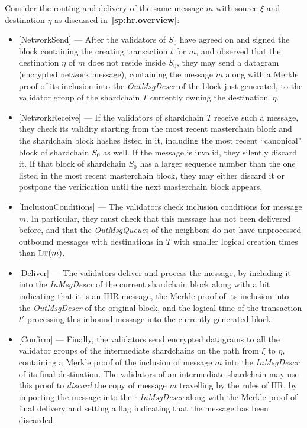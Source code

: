\documentclass[12pt,oneside]{article}
\def\refpoint#1{{\rm\textbf{\ref{#1}}}}
\let\ptref=\refpoint
\def\opsc#1{\operatorname{\textsc{#1}}}
\def\LT{\opsc{Lt}}
\begin{document}
Consider the routing and delivery of the same message $m$ with source $\xi$ and destination $\eta$ as discussed in~\ptref{sp:hr.overview}:
\begin{itemize}
\item{[NetworkSend]} --- After the validators of $S_0$ have agreed on and signed the block containing the creating transaction $t$ for $m$, and observed that the destination $\eta$ of $m$ does not reside inside $S_0$, they may send a datagram (encrypted network message), containing the message $m$ along with a Merkle proof of its inclusion into the {\em OutMsgDescr\/} of the block just generated, to the validator group of the shardchain $T$ currently owning the destination~$\eta$.
\item{[NetworkReceive]} --- If the validators of shardchain $T$ receive such a message, they check its validity starting from the most recent masterchain block and the shardchain block hashes listed in it, including the most recent ``canonical'' block of shardchain $S_0$ as well. If the message is invalid, they silently discard it. If that block of shardchain $S_0$ has a larger sequence number than the one listed in the most recent masterchain block, they may either discard it or postpone the verification until the next masterchain block appears.
\item{[InclusionConditions]} --- The validators check inclusion conditions for message $m$. In particular, they must check that this message has not been delivered before, and that the {\em OutMsgQueue\/}s of the neighbors do not have unprocessed outbound messages with destinations in $T$ with smaller logical creation times than $\LT(m)$.
\item{[Deliver]} --- The validators deliver and process the message, by including it into the {\em InMsgDescr\/} of the current shardchain block along with a bit indicating that it is an IHR message, the Merkle proof of its inclusion into the {\em OutMsgDescr\/} of the original block, and the logical time of the transaction $t'$ processing this inbound message into the currently generated block.
\item{[Confirm]} --- Finally, the validators send encrypted datagrams to all the validator groups of the intermediate shardchains on the path from $\xi$ to $\eta$, containing a Merkle proof of the inclusion of message $m$ into the {\em InMsgDescr\/} of its final destination. The validators of an intermediate shardchain may use this proof to {\em discard\/} the copy of message $m$ travelling by the rules of HR, by importing the message into their {\em InMsgDescr\/} along with the Merkle proof of final delivery and setting a flag indicating that the message has been discarded.
\end{itemize}
\end{document}
